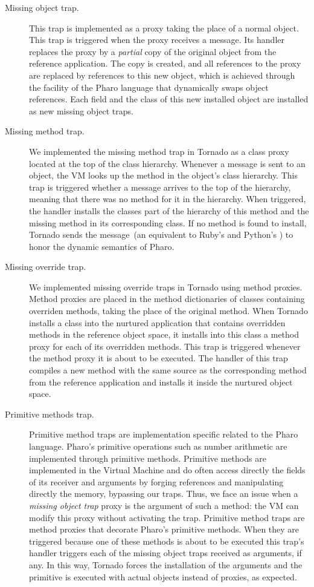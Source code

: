 \begin{description}
\item[Missing object trap.] This trap is implemented as a proxy taking the place of a normal object. This trap is triggered when the proxy receives a message.
Its handler replaces the proxy by a \emph{partial} copy of the original object from the reference application.
The copy is created, and all references to the proxy are replaced by references to this new object, which is achieved through the  facility of the Pharo language that dynamically swaps object references.
Each field and the class of this new installed object are installed as new missing object traps.

\item[Missing method trap.]  We implemented the missing method trap in Tornado as a class proxy located at the top of the class hierarchy. Whenever a message is sent to an object, the VM looks up the method in the object's class hierarchy. This trap is triggered whether a message arrives to the top of the hierarchy, meaning that there was no method for it in the hierarchy. When triggered, the handler installs the classes part of the hierarchy of this method and the missing method in its corresponding class. If no method is found to install, Tornado sends the  message~(an equivalent to \eg Ruby's  and Python's ) to honor the dynamic semantics of Pharo.

\item[Missing override trap.] We implemented missing override traps in Tornado using method proxies. Method proxies are placed in the method dictionaries of classes containing overriden methods, taking the place of the original method.  When Tornado installs a class into the nurtured application that contains overridden methods in the reference object space, it installs into this class a method proxy for each of its overridden methods. This trap is triggered whenever the method proxy it is about to be executed. The handler of this trap compiles a new method with the same source as the corresponding method from the reference application and installs it inside the nurtured object space.

\item[Primitive methods trap.] Primitive method traps are implementation specific related to the Pharo language. Pharo's primitive operations such as number arithmetic are implemented through primitive methods. Primitive methods are implemented in the Virtual Machine and do often access directly the fields of its receiver and arguments by forging references and manipulating directly the memory, bypassing our traps. Thus, we face an issue when a \emph{missing object trap} proxy is the argument of such a method: the VM can modify this proxy without activating the trap. Primitive method traps are method proxies that decorate Pharo's primitive methods. When they are triggered because one of these methods is about to be executed this trap's handler triggers each of the missing object traps received as arguments, if any. In this way, Tornado forces the installation of the arguments and the primitive is executed with actual objects instead of proxies, as expected.


\end{description}

